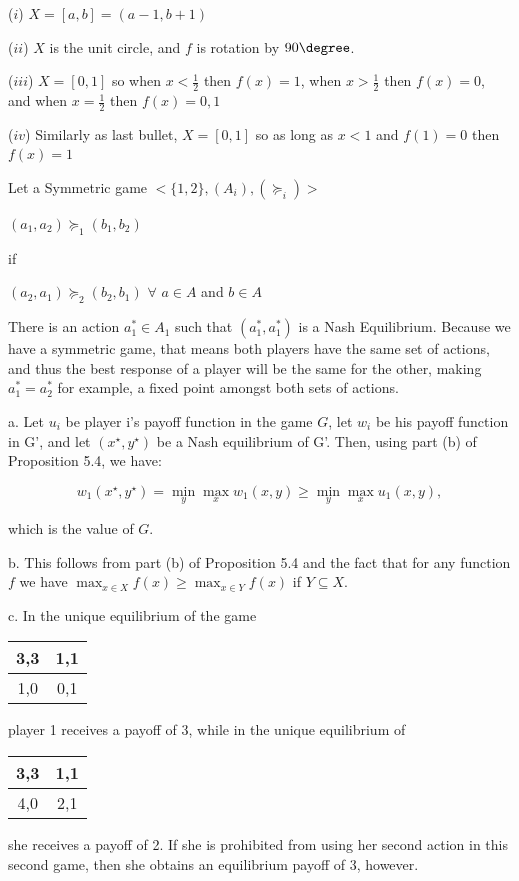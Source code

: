 \documentclass{homework}
\begin{document}
\exercise[20.2]
($i$) $X=[a,b]=(a-1,b+1)$\ 

($ii$) $X$ is the unit circle, and $f$ is rotation by $90\degree$.

($iii$) $X=[0,1]$ so when $x<\frac{1}{2}$ then $f(x)=1$, when $x>\frac{1}{2}$ then $f(x)=0$, and when $x=\frac{1}{2}$ then $f(x)={0,1}$\ 

($iv$) Similarly as last bullet, $X=[0,1]$ so as long as $x<1$ and $f(1)=0$ then $f(x)=1$\ 

\exercise[20.4]
Let a Symmetric game $<\{1,2\},(A_i),(\succcurlyeq_i)>$\ 

\indent\hspace{18pt}$(a_{1},a_{2})\succcurlyeq_{1}(b_{1},b_{2})$\ 

if\

\indent\hspace{18pt}$(a_{2},a_{1})\succcurlyeq_{2}(b_{2},b_{1})$ $\forall$ $ a \in A$ and $b \in A$\ 

There is an action $a_{1}^{\ast} \in A_{1}$ such that $(a_{1}^{\ast},a_{1}^{\ast})$ is a Nash Equilibrium. Because we have a symmetric game, that means both players have the same set of actions, and thus the best response of a player will be the same for the other, making $a_{1}^{\ast}=a_{2}^{\ast}$ for example, a fixed point amongst both sets of actions.

\exercise[24.1]
a. Let $u_i$ be player i's payoff function in the game $G$, let $w_i$ be his payoff function in G', and let $(x^\star, y^\star)$ be a Nash equilibrium of G'. Then, using part (b) of Proposition 5.4, we have:

$$w_1(x^\star, y^\star) = \min_{y} \max_{x} w_1(x, y) \geq \min_{y} \max_{x} u_1(x, y),$$

which is the value of $G$.

b. This follows from part (b) of Proposition 5.4 and the fact that for any function $f$ we have $\max_{x \in X} f(x) \geq \max_{x \in Y} f(x)$ if $Y \subseteq X$.

c. In the unique equilibrium of the game \begin{center}
\begin{tabular}{ |c|c| } 
 \hline
3,3 & 1,1  \\ 
  \hline
 1,0 & 0,1  \\ 
 \hline
\end{tabular}
\end{center}
player 1 receives a payoff of 3, while in the unique equilibrium of \begin{center}
\begin{tabular}{ |c|c|} 
 \hline
 3,3 & 1,1 \\ 
  \hline
 4,0 & 2,1  \\ 
 \hline
\end{tabular}
\end{center} she receives a payoff of 2. If she is prohibited from using her second action in this second game, then she obtains an equilibrium payoff of 3, however.
\end{document}
